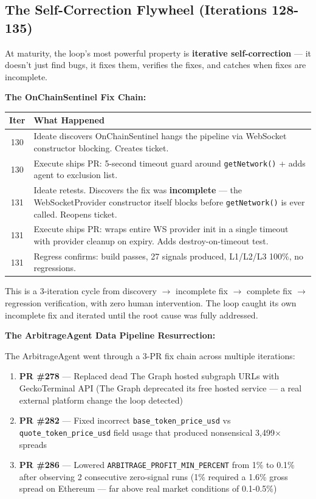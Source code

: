 \documentclass[11pt,a4paper]{article}
\providecommand{\tightlist}{%
  \setlength{\itemsep}{0pt}\setlength{\parskip}{0pt}}
\begin{document}
\subsection{The Self-Correction Flywheel (Iterations 128-135)}\label{sec:self-correction-flywheel-iterations-128-135}

At maturity, the loop's most powerful property is \textbf{iterative self-correction} --- it doesn't just find bugs, it fixes them, verifies the fixes, and catches when fixes are incomplete.

\textbf{The OnChainSentinel Fix Chain:}

\begin{table}[ht]
\small
\renewcommand{\arraystretch}{1.3}
\begin{tabular*}{\textwidth}{@{} c @{\quad} p{13.5cm} @{}}
\toprule
\textbf{Iter} & \textbf{What Happened} \\
\midrule
130 & Ideate discovers OnChainSentinel hangs the pipeline via WebSocket constructor blocking. Creates ticket. \\
130 & Execute ships PR: 5-second timeout guard around \texttt{getNetwork()} + adds agent to exclusion list. \\
131 & Ideate retests. Discovers the fix was \textbf{incomplete} --- the WebSocketProvider constructor itself blocks before \texttt{getNetwork()} is ever called. Reopens ticket. \\
131 & Execute ships PR: wraps entire WS provider init in a single timeout with provider cleanup on expiry. Adds destroy-on-timeout test. \\
131 & Regress confirms: build passes, 27 signals produced, L1/L2/L3 100\%, no regressions. \\
\bottomrule
\end{tabular*}
\end{table}

This is a 3-iteration cycle from discovery $\rightarrow$ incomplete fix $\rightarrow$ complete fix $\rightarrow$ regression verification, with zero human intervention. The loop caught its own incomplete fix and iterated until the root cause was fully addressed.

\textbf{The ArbitrageAgent Data Pipeline Resurrection:}

The ArbitrageAgent went through a 3-PR fix chain across multiple iterations:

\begin{enumerate}
\def\labelenumi{\arabic{enumi}.}
\tightlist
\item
  \textbf{PR \#278} --- Replaced dead The Graph hosted subgraph URLs with GeckoTerminal API (The Graph deprecated its free hosted service --- a real external platform change the loop detected)
\item
  \textbf{PR \#282} --- Fixed incorrect \texttt{base\_token\_price\_usd} vs \texttt{quote\_token\_price\_usd} field usage that produced nonsensical 3,499$\times$ spreads
\item
  \textbf{PR \#286} --- Lowered \texttt{ARBITRAGE\_PROFIT\_MIN\_PERCENT} from 1\% to 0.1\% after observing 2 consecutive zero-signal runs (1\% required a 1.6\% gross spread on Ethereum --- far above real market conditions of 0.1-0.5\%)
\end{enumerate}
\end{document}
